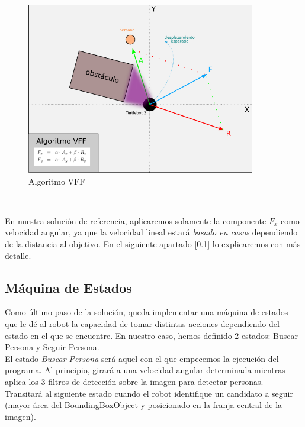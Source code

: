 \begin{figure} [H]
  \begin{center}
    \includegraphics[width=10cm]{imagenes/esquema-vff.png}
  \end{center}
  \caption[Algoritmo VFF]{Algoritmo VFF}
  \label{fig:esquema_vff}
\end{figure}\

En nuestra solución de referencia, aplicaremos solamente la componente $F_x$ como velocidad angular, ya que la velocidad lineal estará \textit{basado en casos} dependiendo de la distancia al objetivo. En el siguiente apartado [\ref{subsec:maquina_estados}] lo explicaremos con más detalle.\\



\subsection{Máquina de Estados}
\label{subsec:maquina_estados}

Como último paso de la solución, queda implementar una máquina de estados que le dé al robot la capacidad de tomar distintas acciones dependiendo del estado en el que se encuentre. En nuestro caso, hemos definido 2 estados: Buscar-Persona y Seguir-Persona.\\

El estado \textit{Buscar-Persona} será aquel con el que empecemos la ejecución del programa. Al principio, girará a una velocidad angular determinada mientras aplica los 3 filtros de detección sobre la imagen para detectar personas. Transitará al siguiente estado cuando el robot identifique un candidato a seguir (mayor área del BoundingBoxObject y posicionado en la franja central de la imagen).\\

